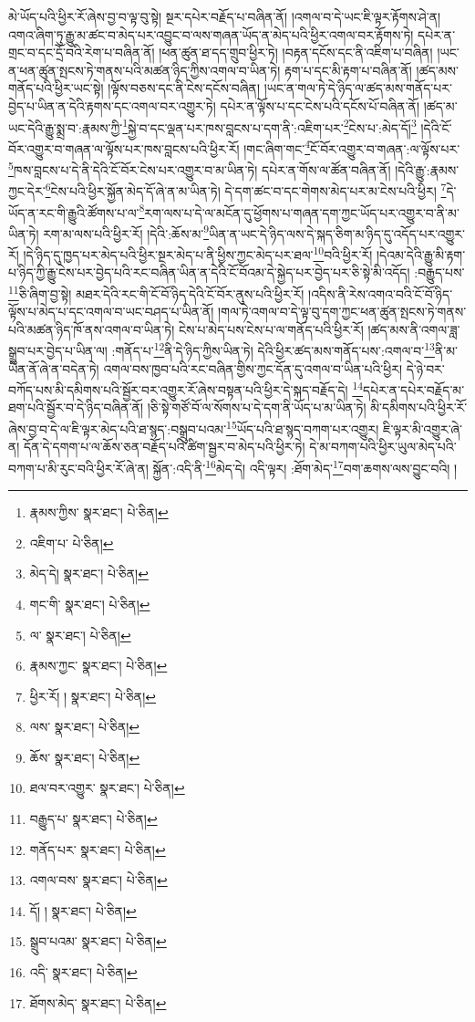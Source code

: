 མེ་ཡོད་པའི་ཕྱིར་རོ་ཞེས་བྱ་བ་ལྟ་བུ་སྟེ། སྔར་དཔེར་བརྗོད་པ་བཞིན་ནོ། །འགལ་བ་དེ་ཡང་ཇི་ལྟར་རྟོགས་ཤེ་ན། འགའ་ཞིག་ཏུ་རྒྱུ་མ་ཚང་བ་མེད་པར་འབྱུང་བ་ལས་གཞན་ཡོད་ན་མེད་པའི་ཕྱིར་འགལ་བར་རྟོགས་ཏེ། དཔེར་ན་གྲང་བ་དང་དྲོ་བའི་རེག་པ་བཞིན་ནོ། །ཕན་ཚུན་ཐ་དད་གྲུབ་ཕྱིར་ཏེ། །བརྟན་དངོས་དང་ནི་འཇིག་པ་བཞིན། །ཡང་ན་ཕན་ཚུན་སྤངས་ཏེ་གནས་པའི་མཚན་ཉིད་ཀྱིས་འགལ་བ་ཡིན་ཏེ། རྟག་པ་དང་མི་རྟག་པ་བཞིན་ནོ། །ཚད་མས་གནོད་པའི་ཕྱིར་ཡང་སྟེ། །ལྟོས་བཅས་དང་ནི་ངེས་དངོས་བཞིན། །ཡང་ན་གལ་ཏེ་དེ་ཉིད་ལ་ཚད་མས་གནོད་པར་བྱེད་པ་ཡིན་ན་དེའི་རྟགས་དང་འགལ་བར་འགྱུར་ཏེ། དཔེར་ན་ལྟོས་པ་དང་ངེས་པའི་དངོས་པོ་བཞིན་ནོ། །ཚད་མ་ཡང་དེའི་རྒྱུ་སྨྲ་བ་:རྣམས་ཀྱི་\footnote{རྣམས་ཀྱིས་  སྣར་ཐང་།  པེ་ཅིན། }སྐྱེ་བ་དང་ལྡན་པར་ཁས་བླངས་པ་དག་ནི་:འཇིག་པར་\footnote{འཇིག་པ་  པེ་ཅིན། }ངེས་པ་:མེད་དོ།\footnote{མེད་དེ།  སྣར་ཐང་།  པེ་ཅིན། } །དེའི་ངོ་བོར་འགྱུར་བ་གཞན་ལ་ལྟོས་པར་ཁས་བླངས་པའི་ཕྱིར་རོ། །གང་ཞིག་གང་\footnote{གང་གི་  སྣར་ཐང་།  པེ་ཅིན། }ངོ་བོར་འགྱུར་བ་གཞན་:ལ་ལྟོས་པར་\footnote{ལ་  སྣར་ཐང་།  པེ་ཅིན། }ཁས་བླངས་པ་དེ་ནི་དེའི་ངོ་བོར་ངེས་པར་འགྱུར་བ་མ་ཡིན་ཏེ། དཔེར་ན་གོས་ལ་ཚོན་བཞིན་ནོ། །དེའི་རྒྱུ་:རྣམས་ཀྱང་དེར་\footnote{རྣམས་ཀྱང་  སྣར་ཐང་།  པེ་ཅིན། }ངེས་པའི་ཕྱིར་སྐྱོན་མེད་དོ་ཞེ་ན་མ་ཡིན་ཏེ། དེ་དག་ཚང་བ་དང་གེགས་མེད་པར་མ་ངེས་པའི་ཕྱིར། \footnote{ཕྱིར་རོ། །   སྣར་ཐང་།  པེ་ཅིན། }དེ་ཡོད་ན་རང་གི་རྒྱུའི་ཚོགས་པ་ལ་\footnote{ལས་  སྣར་ཐང་།  པེ་ཅིན། }རག་ལས་པ་དེ་ལ་མངོན་དུ་ཕྱོགས་པ་གཞན་དག་ཀྱང་ཡོད་པར་འགྱུར་བ་ནི་མ་ཡིན་ཏེ། རག་མ་ལས་པའི་ཕྱིར་རོ། །དེའི་:ཆོས་མ་\footnote{ཆོས་  སྣར་ཐང་།  པེ་ཅིན། }ཡིན་ན་ཡང་དེ་ཉིད་ལས་དེ་སྐད་ཅིག་མ་ཉིད་དུ་འདོད་པར་འགྱུར་རོ། །དེ་ཉིད་དུ་ཁྱད་པར་མེད་པའི་ཕྱིར་སྔར་མེད་པ་ནི་ཕྱིས་ཀྱང་མེད་པར་ཐལ་\footnote{ཐལ་བར་འགྱུར་  སྣར་ཐང་།  པེ་ཅིན། }བའི་ཕྱིར་རོ། །དེའམ་དེའི་རྒྱུ་མི་རྟག་པ་ཉིད་ཀྱི་རྒྱུ་ངེས་པར་བྱེད་པའི་རང་བཞིན་ཡིན་ན་དེའི་ངོ་བོའམ་དེ་སྐྱེད་པར་བྱེད་པར་ཅི་སྟེ་མི་འདོད། :བརྒྱུད་པས་\footnote{བརྒྱུད་པ་  སྣར་ཐང་།  པེ་ཅིན། }ཅི་ཞིག་བྱ་སྟེ། མཐར་དེའི་རང་གི་ངོ་བོ་ཉིད་དེའི་ངོ་བོར་ནུས་པའི་ཕྱིར་རོ། །འདིས་ནི་རེས་འགའ་བའི་ངོ་བོ་ཉིད་ལྟོས་པ་མེད་པ་དང་འགལ་བ་ཡང་བཤད་པ་ཡིན་ནོ། །གལ་ཏེ་འགལ་བ་དེ་ལྟ་བུ་དག་ཀྱང་ཕན་ཚུན་སྤངས་ཏེ་གནས་པའི་མཚན་ཉིད་ཁོ་ནས་འགལ་བ་ཡིན་ཏེ། ངེས་པ་མེད་པས་ངེས་པ་ལ་གནོད་པའི་ཕྱིར་རོ། །ཚད་མས་ནི་འགལ་ཟླ་སྒྲུབ་པར་བྱེད་པ་ཡིན་ལ། :གནོད་པ་\footnote{གནོད་པར་  སྣར་ཐང་།  པེ་ཅིན། }ནི་དེ་ཉིད་ཀྱིས་ཡིན་ཏེ། དེའི་ཕྱིར་ཚད་མས་གནོད་པས་:འགལ་བ་\footnote{འགལ་བས་  སྣར་ཐང་།  པེ་ཅིན། }ནི་མ་ཡིན་ནོ་ཞེ་ན་བདེན་ཏེ། འགལ་བས་ཁྱབ་པའི་རང་བཞིན་གྱིས་ཀྱང་དོན་དུ་འགལ་བ་ཡིན་པའི་ཕྱིར། དེ་ཉེ་བར་བཀོད་པས་མི་དམིགས་པའི་སྦྱོར་བར་འགྱུར་རོ་ཞེས་བསྟན་པའི་ཕྱིར་དེ་སྐད་བརྗོད་དེ། \footnote{དོ། །   སྣར་ཐང་།  པེ་ཅིན། }དཔེར་ན་དཔེར་བརྗོད་མ་ཐག་པའི་སྦྱོར་བ་དེ་ཉིད་བཞིན་ནོ། །ཅི་སྟེ་གཙོ་བོ་ལ་སོགས་པ་དེ་དག་ནི་ཡོད་པ་མ་ཡིན་ཏེ། མི་དམིགས་པའི་ཕྱིར་རོ་ཞེས་བྱ་བ་དེ་ལ་ཇི་ལྟར་མེད་པའི་ཐ་སྙད་:བསྒྲུབ་པའམ་\footnote{སྒྲུབ་པའམ་  སྣར་ཐང་།  པེ་ཅིན། }ཡོད་པའི་ཐ་སྙད་བཀག་པར་འགྱུར། ཇི་ལྟར་མི་འགྱུར་ཞེ་ན། དོན་དེ་དགག་པ་ལ་ཆོས་ཅན་བརྗོད་པའི་ཚིག་སྦྱར་བ་མེད་པའི་ཕྱིར་ཏེ། དེ་མ་བཀག་པའི་ཕྱིར་ཡུལ་མེད་པའི་བཀག་པ་མི་རུང་བའི་ཕྱིར་རོ་ཞེ་ན། སྐྱོན་:འདི་ནི་\footnote{འདི་  སྣར་ཐང་།  པེ་ཅིན། }མེད་དེ། འདི་ལྟར། :ཐོག་མེད་\footnote{ཐོགས་མེད་  སྣར་ཐང་།  པེ་ཅིན། }བག་ཆགས་ལས་བྱུང་བའི། །
